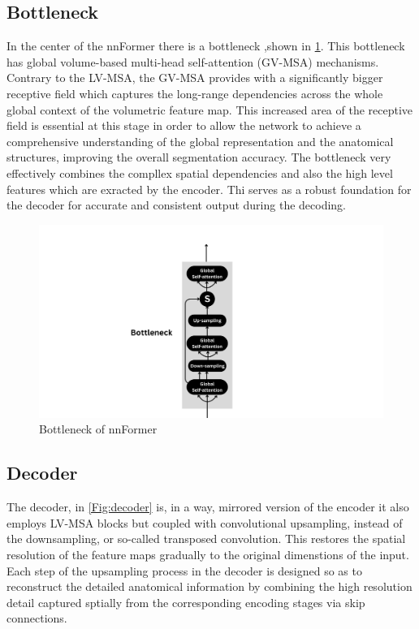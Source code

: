 \subsection{Bottleneck}
In the center of the nnFormer there is a bottleneck ,shown in \cref{Fig:bottleneck}. This bottleneck has global volume-based multi-head self-attention (GV-MSA) mechanisms. Contrary to the LV-MSA, the GV-MSA provides with a significantly bigger receptive field which captures the long-range dependencies across the whole global context of the volumetric feature map. This increased area of the receptive field is essential at this stage in order to allow the network to achieve a comprehensive understanding of the global representation and the anatomical structures, improving the overall segmentation accuracy. The bottleneck very effectively combines the compllex spatial dependencies and also the high level features which are exracted by the encoder. Thi serves as a robust foundation for the decoder for accurate and consistent output during the decoding.

\begin{figure}[htb!]  %
    \centering
	\centering
	\includegraphics[width=1\textwidth]{images/Bottleneck.png}
	\caption{\centering Bottleneck of nnFormer}
	\label{Fig:bottleneck}
\end{figure}

\subsection{Decoder}
The decoder, in \cref{Fig:decoder} is, in a way, mirrored version of the encoder it also employs LV-MSA blocks but coupled with convolutional upsampling, instead of the downsampling, or so-called transposed convolution. This restores the spatial resolution of the feature maps gradually to the original dimenstions of the input. Each step of the upsampling process in the decoder is designed so as to reconstruct the detailed anatomical information by combining the high resolution detail captured sptially from the corresponding encoding stages via skip connections. 

